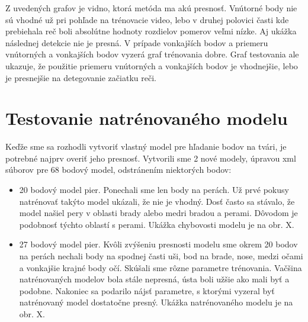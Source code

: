 Z uvedených grafov je vidno, ktorá metóda ma akú presnosť. 
Vnútorné body nie sú vhodné už pri pohľade na trénovacie video, lebo v druhej polovici časti kde prebiehala reč boli absolútne hodnoty rozdielov pomerov veľmi nízke.
Aj ukážka následnej detekcie nie je presná.
V prípade vonkajších bodov a priemeru vnútorných a vonkajších bodov vyzerá graf trénovania dobre.
Graf testovania ale ukazuje, že použitie priemeru vnútorných a vonkajších bodov je vhodnejšie, lebo je presnejšie na detegovanie začiatku reči. 

\section{Testovanie natrénovaného modelu}\label{testovanieModelu}
Keďže sme sa rozhodli vytvoriť vlastný model pre hľadanie bodov na tvári, je potrebné najprv overiť jeho presnosť.
Vytvorili sme 2 nové modely, úpravou xml súborov pre 68 bodový model, odstránením niektorých bodov:
\begin{itemize}
	\item 20 bodový model pier. 
	Ponechali sme len body na perách. 
	Už prvé pokusy natrénovať takýto model ukázali, že nie je vhodný.
	Dosť často sa stávalo, že model našiel pery v oblasti brady alebo medri bradou a perami.
	Dôvodom je podobnosť týchto oblastí s perami. Ukážka chybovosti modelu je na obr. X.
	\item 27 bodový model pier.
	Kvôli zvýšeniu presnosti modelu sme okrem 20 bodov na perách nechali body na spodnej časti uši, bod na brade, nose, medzi očami a vonkajšie krajné body očí.
	Skúšali sme rôzne parametre trénovania. 
	Vačšina natrénovaných modelov bola stále nepresná, ústa boli užšie ako mali byť a podobne.
	Nakoniec sa podarilo nájsť parametre, s ktorými vyzeral byť natrénovaný model dostatočne presný.
	Ukážka natrénovaného modelu je na obr. X.
\end{itemize}


